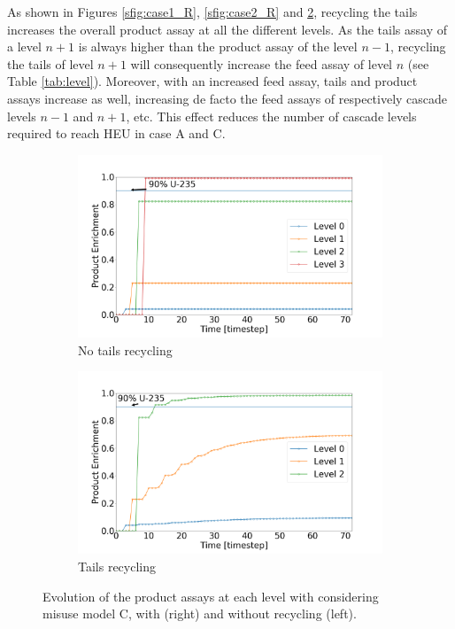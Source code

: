 As shown in Figures \ref{sfig:case1_R}, \ref{sfig:case2_R} and
\ref{sfig:case3_R}, recycling the tails increases the overall product assay at
all the different levels. As the tails assay of a level $n+1$ is always higher than
the product assay of the level $n-1$, recycling the tails of level $n+1$ will
consequently increase the feed assay of level $n$ (see Table \ref{tab:level}).
Moreover, with an increased feed assay, tails and product assays increase as
well, increasing de facto the feed assays of respectively cascade levels $n-1$
and $n+1$, etc.  This effect reduces the number of cascade levels required to reach
\gls{HEU} in case A and C.

\begin{figure}[h!]
    \centering
    \begin{subfigure}[t]{0.45\textwidth}
        \centering
        \includegraphics[scale=0.17]{NR_case3}
        \caption{No tails recycling}
        \label{sfig:case3_NR}
    \end{subfigure}%
    \begin{subfigure}[t]{0.45\textwidth}
        \centering
        \includegraphics[scale=0.17]{R_case3}
        \caption{Tails recycling}
        \label{sfig:case3_R}
    \end{subfigure}
    \caption{Evolution of the product assays at each level with considering
    misuse model C, with (right) and without recycling (left).}
    \label{fig:case3}
\end{figure}



